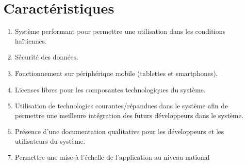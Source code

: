 \documentclass[a4paper, 11pt]{article}
\begin{document}
\section{Caractéristiques}
\begin{enumerate}
  \item Système performant pour permettre une utilisation dans les conditions haïtiennes.
  \item Sécurité des données.
  \item Fonctionnement sur périphérique mobile (tablettes et smartphones).
  \item Licenses libres pour les composantes technologiques du système.
  \item Utilisation de technologies courantes/répandues dans le système afin de permettre une meilleure intégration des futurs développeurs dans le système.
  \item Présence d'une documentation qualitative pour les développeurs et les utilisateurs du système.
  \item Permettre une mise à l'échelle de l'application au niveau national
\end{enumerate}
\end{document}
